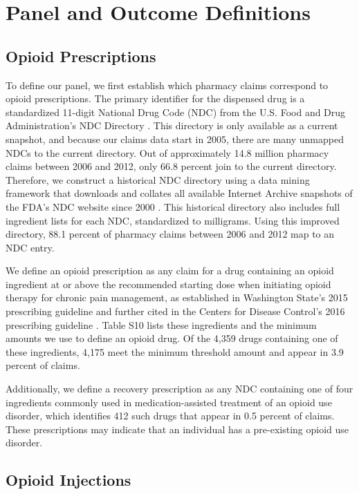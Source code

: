 \documentclass[9pt,twoside]{pnas-new}
\begin{document}
\section{Panel and Outcome Definitions}

\subsection{Opioid Prescriptions}

To define our panel, we first establish which pharmacy claims correspond to opioid prescriptions. The primary identifier for the dispensed drug is a standardized 11-digit National Drug Code (NDC) from the U.S. Food and Drug Administration's NDC Directory \cite{ndc}. This directory is only available as a current snapshot, and because our claims data start in 2005, there are many unmapped NDCs to the current directory. Out of approximately 14.8 million pharmacy claims between 2006 and 2012, only 66.8 percent join to the current directory. Therefore, we construct a historical NDC directory using a data mining framework that downloads and collates all available Internet Archive snapshots of the FDA's NDC website since 2000 \cite{historicalndc}. This historical directory also includes full ingredient lists for each NDC, standardized to milligrams. Using this improved directory, 88.1 percent of pharmacy claims between 2006 and 2012 map to an NDC entry. 

We define an opioid prescription as any claim for a drug containing an opioid ingredient at or above the recommended starting dose when initiating opioid therapy for chronic pain management, as established in Washington State's 2015 prescribing guideline and further cited in the Centers for Disease Control's 2016 prescribing guideline \cite{amdg, dowell}. Table S10 lists these ingredients and the minimum amounts we use to define an opioid drug. Of the 4,359 drugs containing one of these ingredients, 4,175 meet the minimum threshold amount and appear in 3.9 percent of claims.

Additionally, we define a recovery prescription as any NDC containing one of four ingredients commonly used in medication-assisted treatment of an opioid use disorder, which identifies 412 such drugs that appear in 0.5 percent of claims. These prescriptions may indicate that an individual has a pre-existing opioid use disorder.

\subsection{Opioid Injections}
\end{document}
